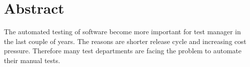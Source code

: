 \chapter{Abstract}

\begin{english} %

The automated testing of software become more important for test manager in the last couple of years. The reasons are shorter release cycle and increasing cost pressure. Therefore many test departments are facing the problem to automate their manual tests.



\todo

\end{english}
